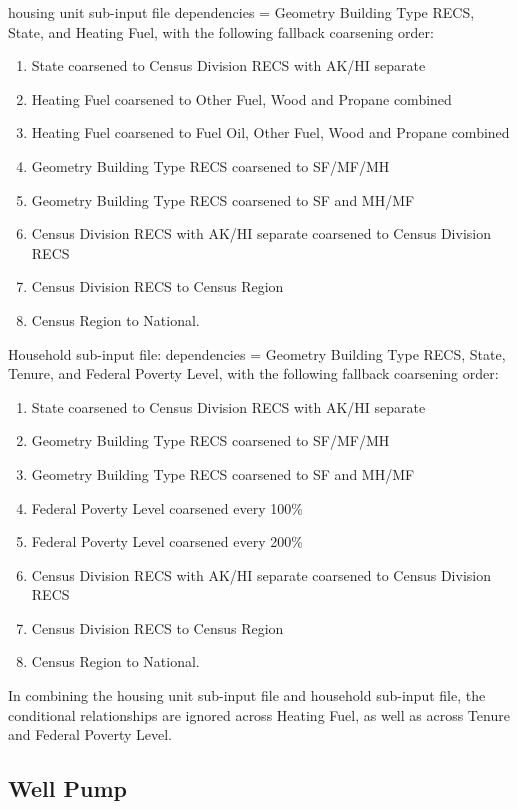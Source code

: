 housing unit sub-input file  dependencies = Geometry Building Type RECS, State, and Heating Fuel, with the following fallback coarsening order:
\begin{enumerate}
    \item State coarsened to Census Division RECS with AK/HI separate 
    \item  Heating Fuel coarsened to Other Fuel, Wood and Propane combined
    \item Heating Fuel coarsened to Fuel Oil, Other Fuel, Wood and Propane combined
    \item Geometry Building Type RECS coarsened to SF/MF/MH
    \item  Geometry Building Type RECS coarsened to SF and MH/MF 
    \item  Census Division RECS with AK/HI separate coarsened to Census Division RECS 
    \item Census Division RECS to Census Region 
    \item Census Region to National.  
\end{enumerate}
Household sub-input file: dependencies = Geometry Building Type RECS, State, Tenure, and Federal Poverty Level, with the following fallback coarsening order:
\begin{enumerate}
    \item State coarsened to Census Division RECS with AK/HI separate 
    \item  Geometry Building Type RECS coarsened to SF/MF/MH 
    \item  Geometry Building Type RECS coarsened to SF and MH/MF 
    \item  Federal Poverty Level coarsened every 100\% 
    \item Federal Poverty Level coarsened every 200\% 
    \item Census Division RECS with AK/HI separate coarsened to Census Division RECS 
    \item Census Division RECS to Census Region 
    \item Census Region to National. 
\end{enumerate}
In combining the housing unit sub-input file and household sub-input file, the conditional relationships are ignored across Heating Fuel, as well as across Tenure and Federal Poverty Level.

\subsection{Well Pump}
